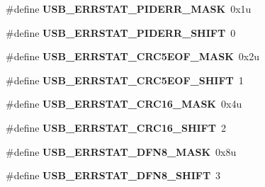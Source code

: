 \begin{DoxyCompactItemize}
\item 
\#define {\bfseries U\+S\+B\+\_\+\+E\+R\+R\+S\+T\+A\+T\+\_\+\+P\+I\+D\+E\+R\+R\+\_\+\+M\+A\+SK}~0x1u\hypertarget{group__USB__Register__Masks_gadf359cce923ca198235ecef76b5cc789}{}\label{group__USB__Register__Masks_gadf359cce923ca198235ecef76b5cc789}

\item 
\#define {\bfseries U\+S\+B\+\_\+\+E\+R\+R\+S\+T\+A\+T\+\_\+\+P\+I\+D\+E\+R\+R\+\_\+\+S\+H\+I\+FT}~0\hypertarget{group__USB__Register__Masks_gaf10f584ce9bbe8d7c0d0b8a6a4f61352}{}\label{group__USB__Register__Masks_gaf10f584ce9bbe8d7c0d0b8a6a4f61352}

\item 
\#define {\bfseries U\+S\+B\+\_\+\+E\+R\+R\+S\+T\+A\+T\+\_\+\+C\+R\+C5\+E\+O\+F\+\_\+\+M\+A\+SK}~0x2u\hypertarget{group__USB__Register__Masks_ga400a9d616bd8457e1003d62d62660b5a}{}\label{group__USB__Register__Masks_ga400a9d616bd8457e1003d62d62660b5a}

\item 
\#define {\bfseries U\+S\+B\+\_\+\+E\+R\+R\+S\+T\+A\+T\+\_\+\+C\+R\+C5\+E\+O\+F\+\_\+\+S\+H\+I\+FT}~1\hypertarget{group__USB__Register__Masks_ga42e986ec54195657a22043422895c708}{}\label{group__USB__Register__Masks_ga42e986ec54195657a22043422895c708}

\item 
\#define {\bfseries U\+S\+B\+\_\+\+E\+R\+R\+S\+T\+A\+T\+\_\+\+C\+R\+C16\+\_\+\+M\+A\+SK}~0x4u\hypertarget{group__USB__Register__Masks_gac9682448ca13abab007c9438e811610c}{}\label{group__USB__Register__Masks_gac9682448ca13abab007c9438e811610c}

\item 
\#define {\bfseries U\+S\+B\+\_\+\+E\+R\+R\+S\+T\+A\+T\+\_\+\+C\+R\+C16\+\_\+\+S\+H\+I\+FT}~2\hypertarget{group__USB__Register__Masks_gaf0bd8a085cd33bc98cf89d6ea726be46}{}\label{group__USB__Register__Masks_gaf0bd8a085cd33bc98cf89d6ea726be46}

\item 
\#define {\bfseries U\+S\+B\+\_\+\+E\+R\+R\+S\+T\+A\+T\+\_\+\+D\+F\+N8\+\_\+\+M\+A\+SK}~0x8u\hypertarget{group__USB__Register__Masks_gaf2aaf7552c127da34a4252936afe561a}{}\label{group__USB__Register__Masks_gaf2aaf7552c127da34a4252936afe561a}

\item 
\#define {\bfseries U\+S\+B\+\_\+\+E\+R\+R\+S\+T\+A\+T\+\_\+\+D\+F\+N8\+\_\+\+S\+H\+I\+FT}~3\hypertarget{group__USB__Register__Masks_gae26a3aed245ac0546edc65afaa2c5542}{}\label{group__USB__Register__Masks_gae26a3aed245ac0546edc65afaa2c5542}


\end{DoxyCompactItemize}
